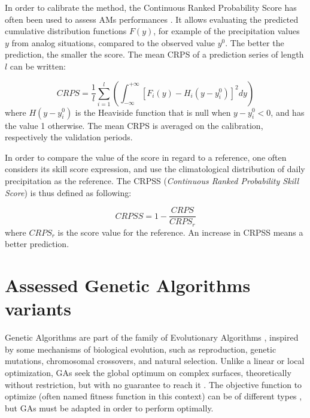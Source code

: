 \documentclass{ametsoc}
\begin{document}
In order to calibrate the method, the Continuous Ranked Probability Score \citep[CRPS,][]{Brown1974, Matheson1976, Hersbach2000} has often been used to assess AMs performances \citep[see, e.g.,][]{Bontron2004, Bontron2005, BenDaoud2008, Horton2012, Marty2012, Radanovics2013, Chardon2014, Junk2015, BenDaoud2016, Caillouet2016}. It allows evaluating the predicted cumulative distribution functions $F(y)$, for example of the precipitation values $y$ from analog situations, compared to the observed value $y^{0}$. The better the prediction, the smaller the score. The mean CRPS of a prediction series of length $l$ can be written:

\begin{equation}
\label{eq:CRPS}
CRPS = \frac{1}{l} \sum_{i=1}^{l} \left(  \int_{-\infty}^{+\infty} \left[ F_{i}(y)-H_{i}(y-y_{i}^{0})\right]^{2} dy \right) 
\end{equation}
where $H(y-y_{i}^{0})$ is the Heaviside function that is null when $y-y_{i}^{0}<0$, and has the value 1 otherwise. The mean CRPS is averaged on the calibration, respectively the validation periods.

In order to compare the value of the score in regard to a reference, one often considers its skill score expression, and use the climatological distribution of daily precipitation as the reference. The CRPSS (\textit{Continuous Ranked Probability Skill Score}) is thus defined as following:

\begin{equation}
\label{eq:CRPSS}
CRPSS = 1-\frac{CRPS}{CRPS_{r}}
\end{equation}
where $CRPS_{r}$ is the score value for the reference. An increase in CRPSS means a better prediction.


\section{Assessed Genetic Algorithms variants}
\label{sec:gas}

Genetic Algorithms \citep[GAs,][]{Holland1992b, Goldberg1989} are part of the family of Evolutionary Algorithms \citep{Back1993b, Schwefel1993}, inspired by some mechanisms of biological evolution, such as reproduction, genetic mutations, chromosomal crossovers, and natural selection. Unlike a linear or local optimization, GAs seek the global optimum on complex surfaces, theoretically without restriction, but with no guarantee to reach it \citep{Haupt2004}. The objective function to optimize (often named fitness function in this context) can be of different types \citep{Joines1996a}, but GAs must be adapted in order to perform optimally.
\end{document}
